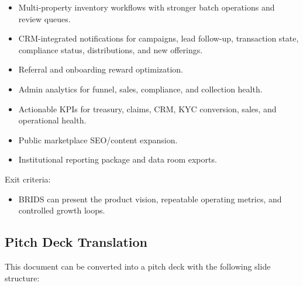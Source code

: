 \documentclass[
  10pt,
  letterpaper,
]{article}
\providecommand{\tightlist}{%
  \setlength{\itemsep}{0pt}\setlength{\parskip}{0pt}}
\begin{document}
\begin{itemize}
\tightlist
\item
  Multi-property inventory workflows with stronger batch operations and
  review queues.
\item
  CRM-integrated notifications for campaigns, lead follow-up,
  transaction state, compliance status, distributions, and new
  offerings.
\item
  Referral and onboarding reward optimization.
\item
  Admin analytics for funnel, sales, compliance, and collection health.
\item
  Actionable KPIs for treasury, claims, CRM, KYC conversion, sales, and
  operational health.
\item
  Public marketplace SEO/content expansion.
\item
  Institutional reporting package and data room exports.
\end{itemize}

Exit criteria:

\begin{itemize}
\tightlist
\item
  BRIDS can present the product vision, repeatable operating metrics,
  and controlled growth loops.
\end{itemize}

\subsection{Pitch Deck Translation}\label{pitch-deck-translation}

This document can be converted into a pitch deck with the following
slide structure:
\end{document}
